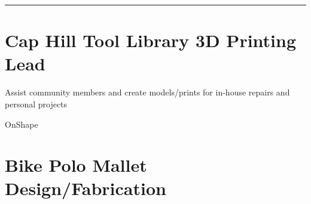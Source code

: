
\vspace{-1.4ex}
{\hspace{-1.72in}\noindent\color{cblue}{HARDWARE PROJECTS} }

\vspace{-1.6ex}
{\hspace{-1.73in}\noindent\color{dblue}\rule{6.935in}{0.4pt}}

\vspace{0.4ex}


\section{
    \textbf{Cap Hill Tool Library} \newline
    3D Printing Lead
}{}

\begin{detail}
    \BulletItem
    Assist community members and create models/prints for in-house repairs and personal projects
\end{detail}

\begin{subtitle}
    \vspace{-5ex}
    {{}} 
\end{subtitle}

\vspace{-1.5ex}
{
    \vspace{-0.8ex}
    \color{cyan}\small
    {OnShape} %
}

{
    \vspace{-2.5ex}\hspace{1.5in}
    \color{cyan}\small
    {} %
}

\vspace{0.4ex}


\section{
    \textbf{Bike Polo} \newline
    Mallet Design/Fabrication
}{}

